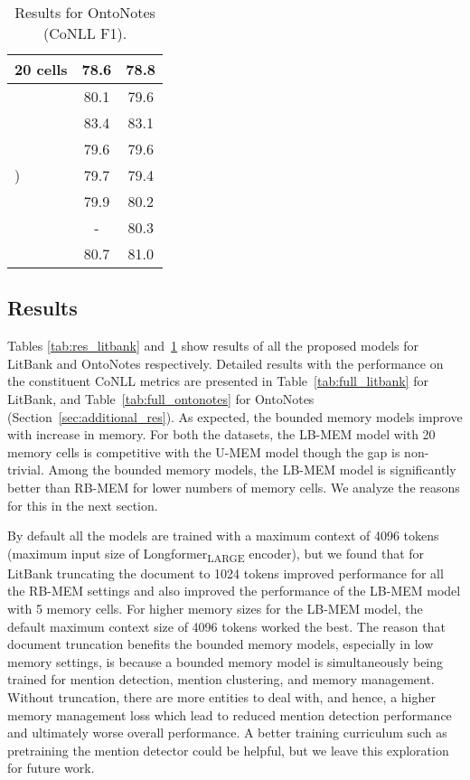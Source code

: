 \documentclass[12pt]{thesis-umich}[thesis]
\newcommand{\unbounded}{U-MEM\xspace}
\newcommand{\learned}{LB-MEM\xspace}
\newcommand{\lru}{RB-MEM\xspace}
\begin{document}
\begin{table}[t]
{\begin{tabular}{lcc}
\hspace{0.1in} 20 cells   & 78.6 & 78.8  \\\midrule
\citet{joshi-etal-2020-spanbert} & 80.1 & 79.6 \\
\citet{wu2019coreference} & 83.4 & 83.1 \\
\citet{toshniwal-etal-2020-learning} & 79.6 & 79.6 \\
\citet{xia-etal-2020-incremental}) & 79.7 & 79.4 \\
\citet{xu-choi-2020-revealing} & 79.9 & 80.2 \\
\citet{kirstain-etal-2021-coreference} & - & 80.3 \\
\citet{dobrovolskii-2021-word} & 80.7 & 81.0 \\
\bottomrule
\end{tabular}
\caption{Results for OntoNotes (CoNLL F1).}
\label{tab:res_ontonotes}

}
\end{table}
 


\subsection{Results}

Tables \ref{tab:res_litbank} and~\ref{tab:res_ontonotes} show results of all the proposed models for LitBank and OntoNotes respectively. 
Detailed results with the performance on the constituent CoNLL metrics are presented in Table~\ref{tab:full_litbank} for LitBank, and Table~\ref{tab:full_ontonotes} for OntoNotes (Section~\ref{sec:additional_res}).
As expected, the bounded memory models improve with increase in memory.
For both the datasets, the \learned model with 20 memory cells is competitive with the \unbounded model though the gap is non-trivial. 
Among the bounded memory models, the \learned model is significantly better than \lru for lower numbers of memory cells. We analyze the reasons for this in the next section.

By default all the models are trained with a maximum context of 4096 tokens (maximum input size  of Longformer\textsubscript{LARGE} encoder), but we found that for LitBank truncating the document to 1024 tokens improved performance for all the \lru settings and also improved the performance of the \learned model with 5 memory cells. For higher memory sizes for the \learned model, the default maximum context size of 4096 tokens worked the best. The reason that document truncation benefits the bounded memory models, especially in low memory settings, is because a bounded memory model is simultaneously being trained for mention detection, mention clustering, and memory management. Without truncation, there are more entities to deal with, and hence, a higher memory management loss which lead to reduced mention detection performance and ultimately worse overall performance. 
A better training curriculum such as pretraining the mention detector could be helpful, but we leave this exploration for future work. 
\end{document}
